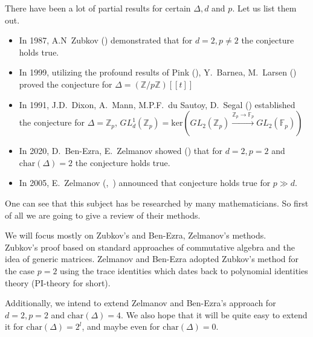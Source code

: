 \documentclass[12pt,a4paper]{article}
\begin{document}
    There have been a lot of partial results for certain $\Delta, d$ and $p$.
    Let us list them out.
    \begin{itemize}
        \item In 1987, A.N\ Zubkov (\cite{Zubkov}) demonstrated that for $d=2, p\neq2$ the conjecture holds true.
        \item In 1999, utilizing the profound results of Pink (\cite{Pink}), Y.\ Barnea, M.\ Larsen (\cite{Barnea-Larsen}) proved the conjecture for $\Delta=\left( \mathbb{Z}/p\mathbb{Z} \right)[[t]]$
        \item In 1991, J.D.\ Dixon, A.\ Mann, M.P.F.\ du Sautoy, D.\ Segal (\cite{DMSD}) established the conjecture for $\Delta=\mathbb{Z}_p$, $GL_d^1(\mathbb{Z}_p)=\mathrm{ker}\left( GL_2(\mathbb{Z}_p) \xrightarrow{\mathbb{Z}_p\to\mathbb{F}_p} GL_2(\mathbb{F}_p) \right)$
        \item In 2020, D.\ Ben-Ezra, E.\ Zelmanov showed (\cite{Ben-Ezra-Zelmanov}) that for $d=2, p=2$ and $\mathrm{char}(\Delta)=2$  the conjecture holds true.
        \item In 2005, E.\ Zelmanov (\cite{Zelmanov1},~\cite{Zelmanov2}) announced that conjecture holds true for $p\gg d$.
    \end{itemize}

    One can see that this subject has be researched by many mathematicians.
    So first of all we are going to give a review of their methods.

    We will focus mostly on Zubkov's and Ben-Ezra, Zelmanov's methods.\\
    Zubkov's proof based on standard approaches of commutative algebra and the idea of generic matrices.
    Zelmanov and Ben-Ezra adopted Zubkov's method for the case $p=2$ using the trace identities which dates back to polynomial identities theory (PI-theory for short).

    Additionally, we intend to extend Zelmanov and Ben-Ezra's approach for $d=2, p=2$ and $\mathrm{char}(\Delta)=4$.
    We also hope that it will be quite easy to extend it for $\mathrm{char}(\Delta)=2^l$, and maybe even for $\mathrm{char}(\Delta)=0$.
\end{document}
